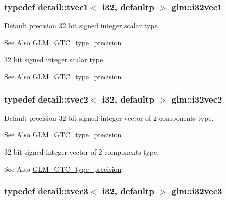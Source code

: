 \hypertarget{group__gtc__type__precision_ga0d3741d44591183f3dee9500b4ad9ab4}{
\subsubsection[{i32vec1}]{\setlength{\rightskip}{0pt plus 5cm}typedef detail\-::tvec1$<$ i32, defaultp $>$ {\bf glm\-::i32vec1}}}\label{group__gtc__type__precision_ga0d3741d44591183f3dee9500b4ad9ab4}
Default precision 32 bit signed integer scalar type. \begin{DoxySeeAlso}{See Also}
\hyperlink{group__gtc__type__precision}{G\-L\-M\-\_\-\-G\-T\-C\-\_\-type\-\_\-precision}
\end{DoxySeeAlso}
32 bit signed integer scalar type. \begin{DoxySeeAlso}{See Also}
\hyperlink{group__gtc__type__precision}{G\-L\-M\-\_\-\-G\-T\-C\-\_\-type\-\_\-precision} 
\end{DoxySeeAlso}
\hypertarget{group__gtc__type__precision_gabb9ac4a278f8a8e3a3928dc9bef81089}{
\subsubsection[{i32vec2}]{\setlength{\rightskip}{0pt plus 5cm}typedef detail\-::tvec2$<$ i32, defaultp $>$ {\bf glm\-::i32vec2}}}\label{group__gtc__type__precision_gabb9ac4a278f8a8e3a3928dc9bef81089}
Default precision 32 bit signed integer vector of 2 components type. \begin{DoxySeeAlso}{See Also}
\hyperlink{group__gtc__type__precision}{G\-L\-M\-\_\-\-G\-T\-C\-\_\-type\-\_\-precision}
\end{DoxySeeAlso}
32 bit signed integer vector of 2 components type. \begin{DoxySeeAlso}{See Also}
\hyperlink{group__gtc__type__precision}{G\-L\-M\-\_\-\-G\-T\-C\-\_\-type\-\_\-precision} 
\end{DoxySeeAlso}
\hypertarget{group__gtc__type__precision_ga79a21b299190b6fee673087376753db0}{
\subsubsection[{i32vec3}]{\setlength{\rightskip}{0pt plus 5cm}typedef detail\-::tvec3$<$ i32, defaultp $>$ {\bf glm\-::i32vec3}}}\label{group__gtc__type__precision_ga79a21b299190b6fee673087376753db0}
